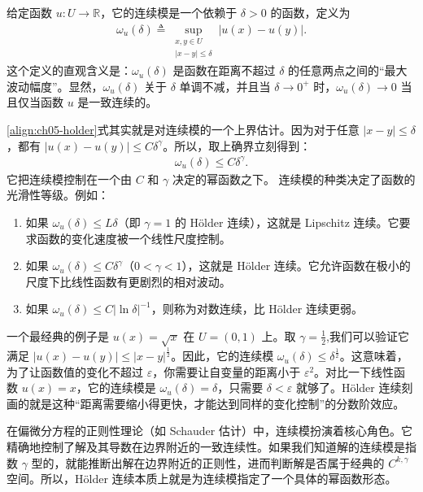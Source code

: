 \documentclass[../../main.tex]{subfiles}
\begin{document}
\begin{remark}
给定函数 \(u: U \to \mathbb{R}\)，它的连续模是一个依赖于 \(\delta > 0\) 的函数，定义为
\begin{align*}
\omega_u(\delta) \triangleq \sup_{\substack{x,y \in U \\ |x-y| \leqslant \delta}} |u(x) - u(y)|.
\end{align*}
这个定义的直观含义是：\(\omega_u(\delta)\) 是函数在距离不超过 \(\delta\) 的任意两点之间的“最大波动幅度”。显然，\(\omega_u(\delta)\) 关于 \(\delta\) 单调不减，并且当 \(\delta \to 0^+\) 时，\(\omega_u(\delta) \to 0\) 当且仅当函数 \(u\) 是一致连续的。

\eqref{align:ch05-holder}式其实就是对连续模的一个上界估计。因为对于任意 \(|x-y| \leqslant \delta\)，都有 \(|u(x)-u(y)| \leqslant C\delta^{\gamma}\)。所以，取上确界立刻得到：
\begin{align*}
\omega_u(\delta) \leqslant C\delta^{\gamma}.
\end{align*}
它把连续模控制在一个由 \(C\) 和 \(\gamma\) 决定的幂函数之下。
连续模的种类决定了函数的光滑性等级。例如：
\begin{enumerate}[(1)]
\item 如果 \(\omega_u(\delta) \leqslant L\delta\)（即 \(\gamma=1\) 的 H\"older 连续），这就是 Lipschitz 连续。它要求函数的变化速度被一个线性尺度控制。
\item 如果 \(\omega_u(\delta) \leqslant C\delta^{\gamma}\)（\(0<\gamma<1\)），这就是 H\"older 连续。它允许函数在极小的尺度下比线性函数有更剧烈的相对波动。
\item 如果 \(\omega_u(\delta) \leqslant C|\ln \delta|^{-1}\)，则称为对数连续，比 H\"older 连续更弱。
\end{enumerate}

一个最经典的例子是 \(u(x) = \sqrt{x}\) 在 \(U = (0, 1)\) 上。取 \(\gamma = \frac{1}{2}\),我们可以验证它满足 \(|u(x) - u(y)| \leqslant |x-y|^{\frac{1}{2}}\)。因此，它的连续模 \(\omega_u(\delta) \leqslant \delta^{\frac{1}{2}}\)。这意味着，为了让函数值的变化不超过 \(\varepsilon \)，你需要让自变量的距离小于 \(\varepsilon ^2\)。对比一下线性函数 \(u(x) = x\)，它的连续模是 \(\omega_u(\delta) = \delta\)，只需要 \(\delta < \varepsilon \) 就够了。H\"older 连续刻画的就是这种“距离需要缩小得更快，才能达到同样的变化控制”的分数阶效应。

在偏微分方程的正则性理论（如 Schauder 估计）中，连续模扮演着核心角色。它精确地控制了解及其导数在边界附近的一致连续性。如果我们知道解的连续模是指数 \(\gamma\) 型的，就能推断出解在边界附近的正则性，进而判断解是否属于经典的 \(C^{k,\gamma}\) 空间。所以，H\"older 连续本质上就是为连续模指定了一个具体的幂函数形态。
\end{remark}
\end{document}
